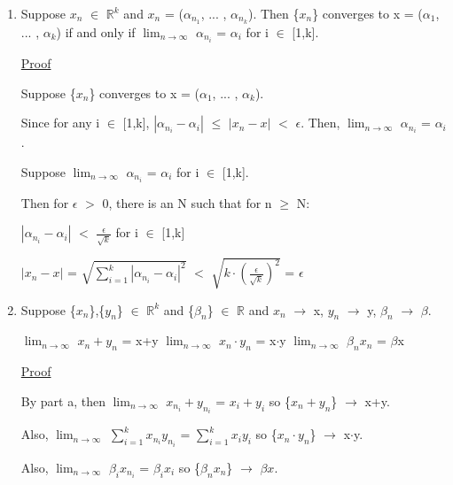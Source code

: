     \begin{enumerate}[label=(\alph*), leftmargin=2cm, itemsep=0.1cm]
        \item Suppose $x_n$ $\in$ $\mathbb{R}^k$ and $x_n$
        = ($\alpha_{n_1}$, ... , $\alpha_{n_k}$).
        Then \{$x_n$\} converges to x = ($\alpha_1$, ... , $\alpha_k$)
        if and only if $\lim_{n \rightarrow \infty}$ $\alpha_{n_i}$ = $\alpha_i$
        for i $\in$ [1,k].

            { \color{magenta} \underline{Proof} }

                Suppose \{$x_n$\} converges to x = ($\alpha_1$, ... , $\alpha_k$).
                
                Since for any i $\in$ [1,k],
                $|\alpha_{n_i} - \alpha_i|$ $\leq$ $|x_n - x|$ $<$ $\epsilon$.
                Then, $\lim_{n \rightarrow \infty}$ $\alpha_{n_i}$ = $\alpha_i$.

                Suppose $\lim_{n \rightarrow \infty}$ $\alpha_{n_i}$ = $\alpha_i$
                for i $\in$ [1,k].
                
                Then for $\epsilon$ $>$ 0, there is an N such that for n $\geq$ N:

                \hspace{1cm}
                $|\alpha_{n_i} - \alpha_i|$ $<$ $\frac{\epsilon}{\sqrt{k}}$
                for i $\in$ [1,k]

                \hspace{1cm}
                $|x_n - x|$
                = $\sqrt{\sum_{i=1}^k |\alpha_{n_i} - \alpha_i|^2}$
                $<$ $\sqrt{k \cdot (\frac{\epsilon}{\sqrt{k}})^2}$
                = $\epsilon$

        \item Suppose \{$x_n$\},\{$y_n$\} $\in$ $\mathbb{R}^k$ and
        \{$\beta_n$\} $\in$ $\mathbb{R}$ and $x_n$ $\rightarrow$ x,
        $y_n$ $\rightarrow$ y, $\beta_n$ $\rightarrow$ $\beta$.
        
        $\lim_{n \rightarrow \infty}$ $x_n + y_n$ = x+y
        \hspace{0.5cm}
        $\lim_{n \rightarrow \infty}$ $x_n \cdot y_n$ = x$\cdot$y
        \hspace{0.5cm}
        $\lim_{n \rightarrow \infty}$ $\beta_n x_n$ = $\beta$x

            { \color{magenta} \underline{Proof} }

                By part a, then
                $\lim_{n \rightarrow \infty}$ $x_{n_i} + y_{n_i}$
                = $x_i + y_i$ so
                \{$x_n + y_n$\} $\rightarrow$ x+y.

                Also,
                $\lim_{n \rightarrow \infty}$ $\sum_{i=1}^k x_{n_i} y_{n_i}$
                = $\sum_{i=1}^k x_i y_i$ so
                \{$x_n \cdot y_n$\} $\rightarrow$ x$\cdot$y.

                Also,
                $\lim_{n \rightarrow \infty}$ $\beta_i x_{n_i}$
                = $\beta_i x_i$ so
                \{$\beta_n x_n$\} $\rightarrow$ $\beta x$. \\
    \end{enumerate}

